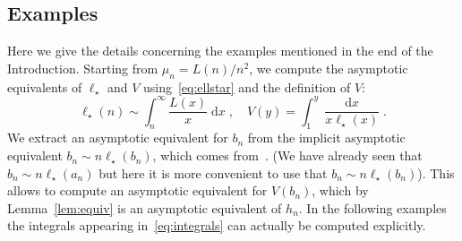 \documentclass[AHL,Unicode,longabstracts,published]{cedram}
\DeclareMathOperator{\dxseq}{d\mathit{x}}
\begin{document}
\subsection{Examples}\label{ssec:examples}

Here we give the details concerning the examples mentioned in the end of the Introduction. Starting from $ \mu_n= {L(n)}/{n^{2}}$, we compute the asymptotic equivalents of $\ell_{\star}$ and $V$ using~\eqref{eq:ellstar} and the definition of $V$:
\begin{equation}\label{eq:integrals}
\ell_{\star}(n)  \sim  \int_{n}^{\infty} \frac{L(x)}{x} \dxseq, \quad V(y)=\int_{1}^{y} \frac{\dxseq}{x \ell_{\star}(x)}.
\end{equation}
We extract an asymptotic equivalent for $b_{n}$ from the implicit asymptotic equivalent $ b_{n} \sim n \ell_{\star}(b_{n})$, which comes from~\cite[Lemma~4.3]{Ber19}. (We have already seen that $ b_{n} \sim n \ell_{\star}(a_{n})$ but here it is more convenient to use that $ b_{n} \sim n \ell_{\star}(b_{n})$). This allows to compute an asymptotic equivalent for $V(b_{n})$, which by Lemma~\ref{lem:equiv} is an asymptotic equivalent of $h_{n}$. In the following examples the integrals appearing in~\eqref{eq:integrals} can actually be computed explicitly.
\end{document}
